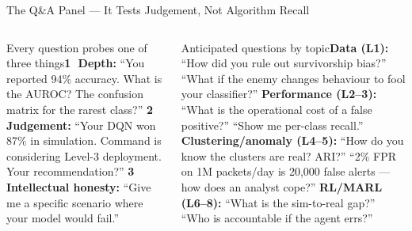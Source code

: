 \documentclass[aspectratio=169,10pt,t]{beamer}
\begin{document}
\begin{frame}{The Q\&A Panel --- It Tests Judgement, Not Algorithm Recall}
\begin{columns}[T]
\begin{cbox}[AccentCol]{Every question probes one of three things}\scriptsize \textbf{\textcircled{\tiny1} Depth:} ``You reported 94\% accuracy. What is the AUROC? The confusion matrix for the rarest class?'' \textbf{\textcircled{\tiny2} Judgement:} ``Your DQN won 87\% in simulation. Command is considering Level-3 deployment. Your recommendation?'' \textbf{\textcircled{\tiny3} Intellectual honesty:} ``Give me a specific scenario where your model would fail.''\end{cbox}
\begin{cbox}[ISSAnavy]{Anticipated questions by topic}\scriptsize \textbf{Data (L1):} ``How did you rule out survivorship bias?'' ``What if the enemy changes behaviour to fool your classifier?'' \textbf{Performance (L2--3):} ``What is the operational cost of a false positive?'' ``Show me per-class recall.'' \textbf{Clustering/anomaly (L4--5):} ``How do you know the clusters are real? ARI?'' ``2\% FPR on 1M packets/day is 20,000 false alerts --- how does an analyst cope?'' \textbf{RL/MARL (L6--8):} ``What is the sim-to-real gap?'' ``Who is accountable if the agent errs?''\end{cbox}
\end{columns}
\end{frame}
\end{document}
